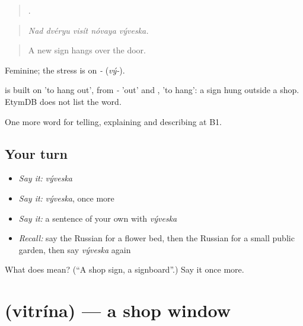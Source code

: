 \begin{quote}
    .
\end{quote}

\begin{quote}
\emph{Nad dvéryu visít nóvaya výveska.}
\end{quote}

\begin{quote}
A new sign hangs over the door.
\end{quote}

Feminine; the stress is on \emph{-} (\emph{vý-}).

\begin{cousinweb}
\emph{} is built on \emph{} 'to hang out', from \emph{-} 'out' and \emph{}, \emph{} 'to hang': a sign hung outside a shop. EtymDB does not list the word.
\end{cousinweb}

\begin{grammarlens}[title={What you've built}]
One more word for telling, explaining and describing at B1.
\end{grammarlens}

\subsection*{Your turn}
\begin{itemize}
\raggedright
  \item \emph{Say it:} \emph{výveska}
  \item \emph{Say it:} \emph{výveska}, once more
  \item \emph{Say it:} a sentence of your own with \emph{výveska}
  \item \emph{Recall:} say the Russian for a flower bed, then the Russian for a small public garden, then say \emph{výveska} again
\end{itemize}

\begin{tcolorbox}[breakable,colback=teal!4,colframe=teal!35!black,title={Before you move on}]
What does  mean? (\textquotedblleft{}A shop sign, a signboard\textquotedblright{}.) Say it once more.
\end{tcolorbox}
\section[\texorpdfstring{\ru{витрина} (vitrína)}{витрина (vitrína)}]{ (vitrína) — a shop window}

